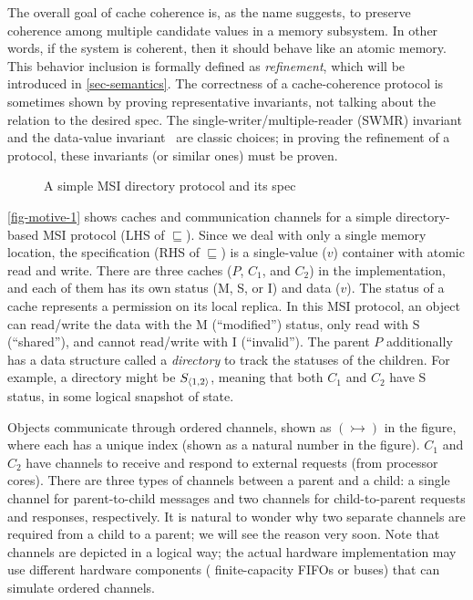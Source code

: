 The overall goal of cache coherence is, as the name suggests, to preserve coherence among multiple candidate values in a memory subsystem.
In other words, if the system is coherent, then it should behave like an atomic memory.
This behavior inclusion is formally defined as \emph{refinement}, which will be introduced in \autoref{sec-semantics}.
The correctness of a cache-coherence protocol is sometimes shown by proving representative invariants, not talking about the relation to the desired spec.
The single-writer/multiple-reader (SWMR) invariant and the data-value invariant~\cite{ccbook:2020} are classic choices; in proving the refinement of a protocol, these invariants (or similar ones) must be proven.

\begin{figure}[t]
  \centering
  \caption{A simple MSI directory protocol and its spec}
  \label{fig-motive-1}
\end{figure}

\autoref{fig-motive-1} shows caches and communication channels for a simple directory-based MSI protocol (LHS of $\sqsubseteq$).
Since we deal with only a single memory location, the specification (RHS of $\sqsubseteq$) is a single-value ($v$) container with atomic read and write.
There are three caches ($P$, $C_1$, and $C_2$) in the implementation, and each of them has its own status (M, S, or I) and data ($v$).
The status of a cache represents a permission on its local replica.
In this MSI protocol, an object can read/write the data with the M (``modified'') status, only read with S (``shared''), and cannot read/write with I (``invalid'').
The parent $P$ additionally has a data structure called a \emph{directory} to track the statuses of the children.
For example, a directory might be $S_{\langle 1, 2 \rangle}$, meaning that both $C_1$ and $C_2$ have S status, in some logical snapshot of state.

Objects communicate through ordered channels, shown as $(\rightarrowtail)$ in the figure, where each has a unique index (shown as a natural number in the figure).
$C_1$ and $C_2$ have channels to receive and respond to external requests (from processor cores).
There are three types of channels between a parent and a child: a single channel for parent-to-child messages and two channels for child-to-parent requests and responses, respectively.
It is natural to wonder why two separate channels are required from a child to a parent; we will see the reason very soon.
Note that channels are depicted in a logical way; the actual hardware implementation may use different hardware components (\eg{} finite-capacity FIFOs or buses) that can simulate ordered channels.

